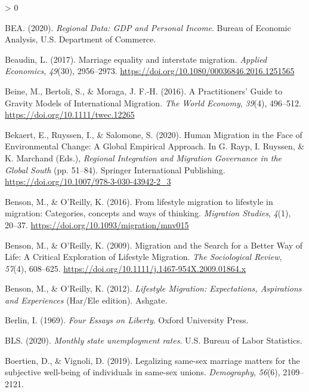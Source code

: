 \documentclass[
  11pt,
]{article}
\newlength{\cslhangindent}
\newenvironment{CSLReferences}[2] %
 {%
  \setlength{\parindent}{0pt}
  \ifodd #1 \everypar{\setlength{\hangindent}{\cslhangindent}}\ignorespaces\fi
  \ifnum #2 > 0
  \setlength{\parskip}{#2\baselineskip}
  \fi
 }%
 {}
\begin{document}
\begin{CSLReferences}{1}{0}
\leavevmode\hypertarget{ref-bea_2020}{}%
BEA. (2020). \emph{Regional {Data}: {GDP} and {Personal Income}}. {Bureau of Economic Analysis, U.S. Department of Commerce}.

\leavevmode\hypertarget{ref-beaudin_2017}{}%
Beaudin, L. (2017). Marriage equality and interstate migration. \emph{Applied Economics}, \emph{49}(30), 2956--2973. \url{https://doi.org/10.1080/00036846.2016.1251565}

\leavevmode\hypertarget{ref-beine_2016}{}%
Beine, M., Bertoli, S., \& Moraga, J. F.-H. (2016). A {Practitioners}' {Guide} to {Gravity Models} of {International Migration}. \emph{The World Economy}, \emph{39}(4), 496--512. \url{https://doi.org/10.1111/twec.12265}

\leavevmode\hypertarget{ref-bekaert_2020}{}%
Bekaert, E., Ruyssen, I., \& Salomone, S. (2020). Human {Migration} in the {Face} of {Environmental Change}: {A Global Empirical Approach}. In G. Rayp, I. Ruyssen, \& K. Marchand (Eds.), \emph{Regional {Integration} and {Migration Governance} in the {Global South}} (pp. 51--84). {Springer International Publishing}. \url{https://doi.org/10.1007/978-3-030-43942-2_3}

\leavevmode\hypertarget{ref-benson_2016}{}%
Benson, M., \& O'Reilly, K. (2016). From lifestyle migration to lifestyle in migration: {Categories}, concepts and ways of thinking. \emph{Migration Studies}, \emph{4}(1), 20--37. \url{https://doi.org/10.1093/migration/mnv015}

\leavevmode\hypertarget{ref-benson_2009}{}%
Benson, M., \& O'Reilly, K. (2009). Migration and the {Search} for a {Better Way} of {Life}: {A Critical Exploration} of {Lifestyle Migration}. \emph{The Sociological Review}, \emph{57}(4), 608--625. \url{https://doi.org/10.1111/j.1467-954X.2009.01864.x}

\leavevmode\hypertarget{ref-benson_2012}{}%
Benson, M., \& O'Reilly, K. (2012). \emph{Lifestyle {Migration}: {Expectations}, {Aspirations} and {Experiences}} (Har/Ele edition). {Ashgate}.

\leavevmode\hypertarget{ref-berlin_1969_four}{}%
Berlin, I. (1969). \emph{Four {Essays} on {Liberty}}. {Oxford University Press}.

\leavevmode\hypertarget{ref-bls_2020}{}%
BLS. (2020). \emph{Monthly state unemployment rates}. {U.S. Bureau of Labor Statistics}.

\leavevmode\hypertarget{ref-boertien_2019}{}%
Boertien, D., \& Vignoli, D. (2019). Legalizing same-sex marriage matters for the subjective well-being of individuals in same-sex unions. \emph{Demography}, \emph{56}(6), 2109--2121.


\end{CSLReferences}
\end{document}
